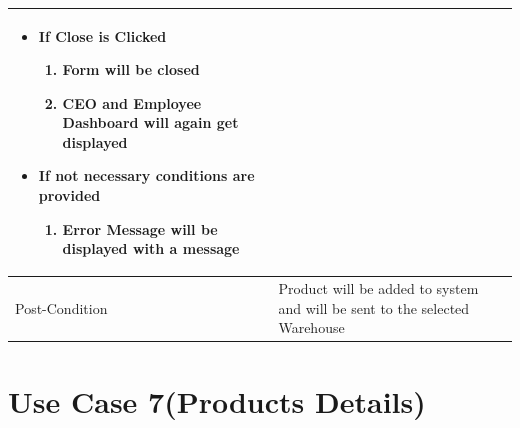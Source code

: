 \documentclass[12pt,a4paper]{report}
\begin{document}
\begin{tabular}{ | m{3cm} | m{12cm}| }
\begin{itemize}
\begin{enumerate}
	\end{enumerate}
\item 	If Close is Clicked
	\begin{enumerate}
	   	 \item	Form will be closed
	   	 \item	CEO and Employee Dashboard will again get displayed
	\end{enumerate}
\item If not necessary conditions are provided
	\begin{enumerate}
		\item Error Message will be displayed with a message
	\end{enumerate} 
\end{itemize}
\\ \hline
Post-Condition &    Product will be added to system and will be sent to the selected Warehouse\\ \hline

\end{tabular}
\section{Use Case 7(Products Details) }
\end{document}
